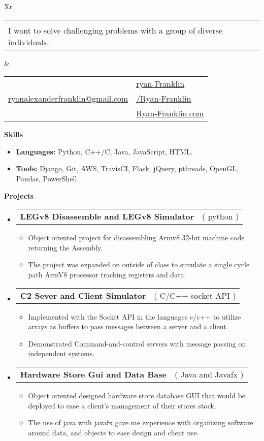 \documentclass[letterpaper,12pt]{article}[leftmargin=*]
\makeatletter
\def \fullname {Ryan Franklin}
\def \subtitle {}
\def \linkedinicon {\faLinkedin}
\def \linkedinlink {https://www.linkedin.com/in/ryan-franklin-715949211/}
\def \linkedintext {ryan-Franklin}
\def \phoneicon {\faPhone}
\def \phonetext {+1 (512) 354-5907}
\def \emailicon {\faEnvelope}
\def \emaillink {mailto:ryanalexanderfranklin@gmail.com}
\def \emailtext {ryanalexanderfranklin@gmail.com}
\def \githubicon {\faGithub}
\def \githublink {https://github.com/ryan-franklin}
\def \githubtext {/Ryan-Franklin}
\def \websiteicon {\faGlobe}
\def \websitelink {https://google.com/}
\def \websitetext {Ryan-Franklin.com}
\def \headertype {\doublecol} %
\def \entryspacing {-0pt}
\def \linkedin {\linkedinicon \hspace{3pt}\href{\linkedinlink}{\linkedintext}}
\def \phone {\phoneicon \hspace{3pt}{ \phonetext}}
\def \email {\emailicon \hspace{3pt}\href{\emaillink}{\emailtext}}
\def \github {\githubicon \hspace{3pt}\href{\githublink}{\githubtext}}
\def \website {\websiteicon \hspace{3pt}\href{\websitelink}{\websitetext}}
\renewcommand{\section}[2]{\vspace{5pt}
  \colorbox{secondary}{\color{white}\raggedbottom\normalsize\textbf{{#1}{\hspace{7pt}#2}}}
}
\newcommand{\resumeEntryStart}{\begin{itemize}[leftmargin=2.5mm]}
\newcommand{\resumeEntryEnd}{\end{itemize}\vspace{\entryspacing}}
\newcommand{\resumeItemListStart}{\begin{itemize}[leftmargin=4.5mm]}
\newcommand{\resumeItemListEnd}{\end{itemize}}
\newcommand{\resumeItem}[1]{
  \item\small{
    {#1 \vspace{-2pt}}
  }
}
\newcommand{\resumeEntryTD}[2]{
  \vspace{-1pt}\item[]
    \begin{tabularx}{0.97\textwidth}{X@{\hspace{60pt}}r}
      \textbf{\color{primary}#1} & {\firabook\color{accent}\small#2} \\
    \end{tabularx}\vspace{-6pt}
}
\newcommand{\resumeEntryS}[2]{
  \item[]\small{
    \textbf{\color{primary}#1 }{ #2 \vspace{-6pt}}
  }
}
\newcommand{\doublecol}[6]{
  \begin{tabularx}{\textwidth}{Xr}
    {
      \begin{tabular}[c]{l}
        \fontsize{35}{45}\selectfont{\color{primary}{{\textbf{\fullname}}}} \\
        {\textit{\subtitle\vspace{4pt}}I want to solve challenging problems with a group of diverse individuals.} %
      \end{tabular}
    } & {
      \begin{tabular}[c]{l@{\hspace{1.5em}}l}
        {\small#4} & {\small#1} \\
        {\small#5} & {\small#2} \\
        {\small#6} & {\small#3}
      \end{tabular}
    }
  \end{tabularx}
}
\newcommand{\singlecol}[6]{
  \begin{tabularx}{\textwidth}{Xr}
    {
      \begin{tabular}[b]{l}
        \fontsize{35}{45}\selectfont{\color{primary}{{\textbf{\fullname}}}} \\
        {\textit{\subtitle}} %
      \end{tabular}
    } & {
      \begin{tabular}[c]{l}
        {\small#1} \\
        {\small#2} \\
        {\small#3} \\
        {\small#4} \\
        {\small#5} \\
        {\small#6}
      \end{tabular}
    }
  \end{tabularx}
}
\makeatother
\begin{document}


\headertype{\linkedin}{\github}{\website}{\phone}{\email}{} %
\vspace{-10pt} %

\section{\faGears}{Skills }
 \resumeEntryStart
  \resumeEntryS{Languages:} {Python, C++/C, Java, JavaScript, HTML.}
  \resumeEntryS{Tools:} {Django, Git, AWS, TravisCI, Flask, jQuery, pthreads, OpenGL, Pandas, PowerShell}
 \resumeEntryEnd
 
\section{\faCode}{Projects }

  \resumeEntryStart
    \resumeEntryTD
      {LEGv8 Disassemble and LEGv8 Simulator}{( python )}
    \resumeItemListStart
      \resumeItem {Object oriented project for disassembling Armv8 32-bit machine code returning the Assembly.}
      \resumeItem { The project was expanded on outside of class to simulate a single cycle path ArmV8 processor tracking registers and data.}
    \resumeItemListEnd
  \resumeEntryEnd

  \resumeEntryStart
    \resumeEntryTD
      {C2 Sever and Client Simulator}{( C/C++ socket API )}
    \resumeItemListStart
      \resumeItem {Implemented with the Socket API in the languages c/c++ to utilize arrays as buffers to pass messages between a server and a client.}
      \resumeItem {Demonstrated Command-and-control servers with message passing on independent systems.}
    \resumeItemListEnd
  \resumeEntryEnd
  
  \resumeEntryStart
    \resumeEntryTD
      {Hardware Store Gui and Data Base }{( Java and Javafx )}
    \resumeItemListStart
      \resumeItem { Object oriented designed hardware store database GUI that would be deployed to ease a client's management of their stores stock.}
      \resumeItem { The use of java with javafx gave me experience with organizing software around data, and objects to ease design and client use. }
    \resumeItemListEnd
  \resumeEntryEnd
  
\end{document}
